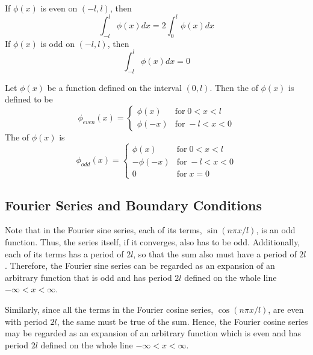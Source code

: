 \begin{remark}
    If $\phi(x)$ is even on $(-l,l)$, then \begin{equation*}
        \int_{-l}^l\phi(x)dx = 2\int_0^l\phi(x)dx
    \end{equation*}
    If $\phi(x)$ is odd on $(-l,l)$, then \begin{equation*}
        \int_{-l}^l\phi(x)dx = 0
    \end{equation*}
\end{remark}

\begin{definition}
    Let $\phi(x)$ be a function defined on the interval $(0,l)$. Then the  of $\phi(x)$ is defined to be \begin{equation*}
        \phi_{even}(x) = \left\{\begin{array}{lc} \phi(x) & \text{for}\;0<x<l \\ \phi(-x)& \text{for}\;-l < x < 0\end{array}\right.
    \end{equation*}
    The  of $\phi(x)$ is \begin{equation*}
        \phi_{odd}(x) = \left\{\begin{array}{lc} \phi(x) & \text{for}\;0<x<l \\ -\phi(-x)& \text{for}\;-l < x < 0 \\ 0 & \text{for}\; x= 0\end{array}\right.
    \end{equation*}
\end{definition}

\subsection{Fourier Series and Boundary Conditions}

Note that in the Fourier sine series, each of its terms, $\sin(n\pi x/l)$, is an odd function. Thus, the series itself, if it converges, also has to be odd. Additionally, each of its terms has a period of $2l$, so that the sum also must have a period of $2l$. Therefore, the Fourier sine series can be regarded as an expansion of an arbitrary function that is odd and has period $2l$ defined on the whole line $-\infty < x < \infty$.

Similarly, since all the terms in the Fourier cosine series, $\cos(n\pi x/l)$, are even with period $2l$, the same must be true of the sum. Hence, the Fourier cosine series may be regarded as an expansion of an arbitrary function which is even and has period $2l$ defined on the whole line $-\infty < x < \infty$.

